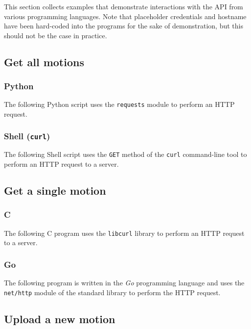 

This section collects examples that demonstrate interactions with the API
from various programming languages. Note that placeholder credentials and hostname have been hard-coded into the programs for the sake of demonstration, but this should not be the case in practice.


\subsection{Get all motions}\label{get-all-motions}

\subsubsection{Python}
The following Python script uses the \texttt{requests} module to perform an HTTP request.
% 


\subsubsection{Shell (\texttt{curl})}\label{sec:get-all-shell}

The following Shell script uses the \texttt{GET} method of the \texttt{curl} command-line tool to perform an HTTP request to a server.
% 


\subsection{Get a single motion}\label{get-a-single-motion}

\subsubsection{C}
The following C program uses the \texttt{libcurl} library to perform an HTTP request to a server. 



\subsubsection{Go}
The following program is written in the \emph{Go} programming language and uses the \texttt{net/http} module of the standard library to perform the HTTP request.


\hypertarget{upload-a-new-motion}{%
\subsection{Upload a new motion}\label{upload-a-new-motion}}

